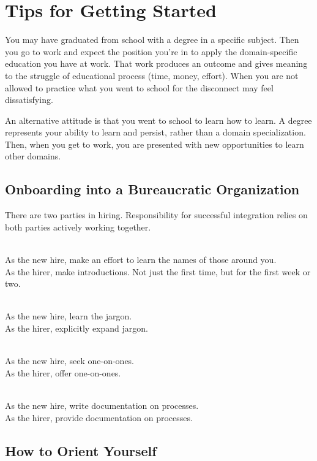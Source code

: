 \section{Tips for Getting Started}

You may have graduated from school with a degree in a specific subject. Then you go to work and expect the position you're in to apply the domain-specific education you have at work. That work produces an outcome and gives meaning to the struggle of educational process (time, money, effort). When you are not allowed to practice what you went to school for the disconnect may feel dissatisfying.

An alternative attitude is that you went to school to learn how to learn. A degree represents your ability to learn and persist, rather than a domain specialization. Then, when you get to work, you are presented with new opportunities to learn other domains. 

\subsection*{Onboarding into a Bureaucratic Organization}

There are two parties in hiring. Responsibility for successful integration relies on both parties actively working together.

\ \\
As the new hire, make an effort to learn the names of those around you.\\
As the hirer, make introductions. Not just the first time, but for the first week or two.

\ \\
As the new hire, learn the jargon.\\
As the hirer, explicitly expand jargon.

\ \\
As the new hire, seek one-on-ones.\\
As the hirer, offer one-on-ones.

\ \\
As the new hire, write documentation on processes.\\
As the hirer, provide documentation on processes.

\subsection*{How to Orient Yourself}

